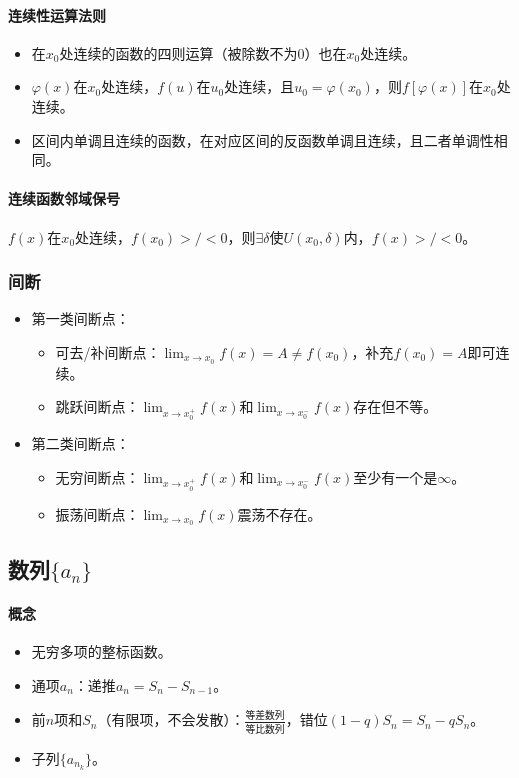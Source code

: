 \documentclass[
12pt, %
a4paper, 
oneside, %
]{scrartcl}
\begin{document}
\paragraph{连续性运算法则}
\begin{itemize}
\item 在$ x_0 $处连续的函数的四则运算（被除数不为$ 0 $）也在$ x_0 $处连续。
\item $ \varphi (x) $在$ x_0 $处连续，$ f(u) $在$ u_0 $处连续，且$ u_0 = \varphi (x_0) $，则$ f[\varphi (x)] $在$ x_0 $处连续。
\item 区间内单调且连续的函数，在对应区间的反函数单调且连续，且二者单调性相同。
\end{itemize}
\paragraph{连续函数邻域保号}
$ f(x) $在$ x_0 $处连续，$ f(x_0) >/< 0 $，则$ \exists \delta $使$ U(x_0, \delta) $内，$ f(x) >/< 0 $。
\subsubsection[间断]{间断}
\begin{itemize}
\item 第一类间断点：
\begin{itemize}
\item 可去/补间断点：$ \lim_{x \to x_0}f(x) = A \neq f(x_0) $，补充$ f(x_0) = A $即可连续。
\item 跳跃间断点：$ \lim_{x \to x_0^+}f(x) $和$ \lim_{x \to x_0^-}f(x) $存在但不等。
\end{itemize}
\item 第二类间断点：
\begin{itemize}
\item 无穷间断点：$ \lim_{x \to x_0^+}f(x) $和$ \lim_{x \to x_0^-}f(x) $至少有一个是$ \infty $。
\item 振荡间断点：$ \lim_{x \to x_0}f(x) $震荡不存在。
\end{itemize}
\end{itemize}
\subsection[数列]{数列$ \{a_n\} $}
\paragraph{概念}
\begin{itemize}
\item 无穷多项的整标函数。
\item 通项$ a_n $：递推$ a_n = S_n - S_{n - 1} $。
\item 前$ n $项和$ S_n $（有限项，不会发散）：$ \frac{\text{等差数列}}{\text{等比数列}} $，错位$ (1 - q) S_n = S_n - q S_n $。
\item 子列$ \{a_{n_k}\} $。
\end{itemize}
\end{document}
